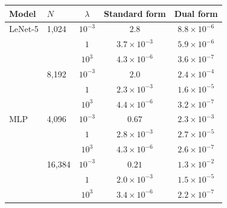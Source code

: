 \begin{tabular}{llccc}
    \hline
    Model & $N$ & $\lambda$ & Standard form & Dual form \\
    \hline
    LeNet-5 & 1,024 & $10^{-3}$ & $2.8$ & $8.8 {\times} 10^{-6}$ \\
     &  & $1$ & $3.7 {\times} 10^{-3}$ & $5.9 {\times} 10^{-6}$ \\
     &  & $10^{3}$ & $4.3 {\times} 10^{-6}$ & $3.6 {\times} 10^{-7}$ \\
    \hline
     & 8,192 & $10^{-3}$ & $2.0$ & $2.4 {\times} 10^{-4}$ \\
     &  & $1$ & $2.3 {\times} 10^{-3}$ & $1.6 {\times} 10^{-5}$ \\
     &  & $10^{3}$ & $4.4 {\times} 10^{-6}$ & $3.2 {\times} 10^{-7}$ \\
    \hline
    MLP & 4,096 & $10^{-3}$ & $0.67$ & $2.3 {\times} 10^{-3}$ \\
     &  & $1$ & $2.8 {\times} 10^{-3}$ & $2.7 {\times} 10^{-5}$ \\
     &  & $10^{3}$ & $4.3 {\times} 10^{-6}$ & $2.6 {\times} 10^{-7}$ \\
    \hline
     & 16,384 & $10^{-3}$ & $0.21$ & $1.3 {\times} 10^{-2}$ \\
     &  & $1$ & $2.0 {\times} 10^{-3}$ & $1.5 {\times} 10^{-5}$ \\
     &  & $10^{3}$ & $3.4 {\times} 10^{-6}$ & $2.2 {\times} 10^{-7}$ \\
    \hline
\end{tabular}
